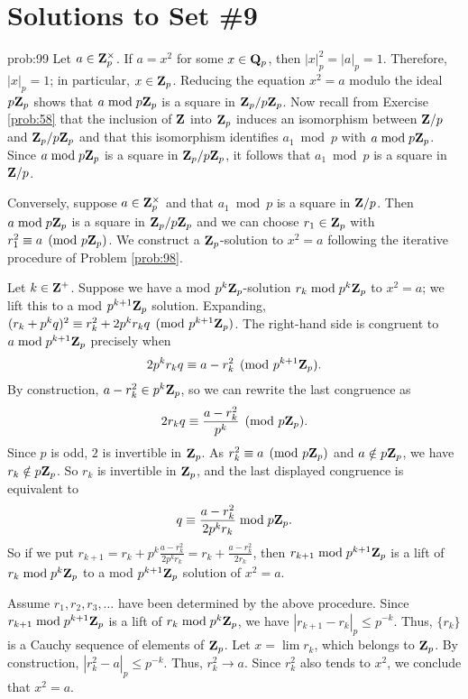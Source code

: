 \chapter*{Solutions to Set \#9}
\label{set8sols}

\begin{sol}{prob:99} Let $a \in \mathbf{Z}_p^{\times}$. If $a=x^2$ for some $x \in \mathbf{Q}_p$, then $|x|_p^2 = |a|_p = 1$. Therefore, $|x|_p = 1$; in particular, $x \in \mathbf{Z}_p$. Reducing the equation $x^2=a$ modulo the ideal $p\mathbf{Z}_p$ shows that $a\bmod{p\mathbf{Z}_p}$ is a square in $\mathbf{Z}_p/p\mathbf{Z}_p$. Now recall from Exercise \ref{prob:58} that the inclusion of $\mathbf{Z}$ into $\mathbf{Z}_p$ induces an isomorphism between $\mathbf{Z}/p$ and $\mathbf{Z}_p/p\mathbf{Z}_p$ and that this isomorphism identifies $a_1\bmod{p}$ with $a\bmod{p\mathbf{Z}_p}$. Since $a\bmod{p\mathbf{Z}_p}$ is a square in $\mathbf{Z}_p/p\mathbf{Z}_p$, it follows that $a_1\bmod{p}$ is a square in $\mathbf{Z}/p$.

Conversely, suppose $a\in \mathbf{Z}_p^{\times}$ and that $a_1\bmod{p}$ is a square in $\mathbf{Z}/p$. Then $a\bmod{p\mathbf{Z}_p}$ is a square in $\mathbf{Z}_p/p\mathbf{Z}_p$ and we can choose $r_1 \in \mathbf{Z}_p$ with $r_1^2\equiv a\pmod{p\mathbf{Z}_p}$. We construct a $\mathbf{Z}_p$-solution to $x^2=a$ following the iterative procedure of Problem \ref{prob:98}.

Let $k \in \mathbf{Z}^{+}$. Suppose we have a mod $p^k\mathbf{Z}_p$-solution $r_k\bmod{p^k\mathbf{Z}_p}$ to $x^2=a$; we lift this to a mod $p^{k+1}\mathbf{Z}_p$ solution. Expanding, $(r_k + p^k q)^2 \equiv r_k^2 + 2p^k r_k q \pmod{p^{k+1}\mathbf{Z}_p}$. The right-hand side is congruent to $a\bmod{p^{k+1}\mathbf{Z}_p}$ precisely when
\[ 2p^k r_k q \equiv a-r_k^2\pmod{p^{k+1}\mathbf{Z}_p}. \]
By construction, $a-r_k^2 \in p^k\mathbf{Z}_p$, so we can rewrite the last congruence as
\[ 2r_k q \equiv \frac{a-r_k^2}{p^k} \pmod{p\mathbf{Z}_p}.\]
Since $p$ is odd, $2$ is invertible in $\mathbf{Z}_p$. As $r_k^2\equiv a\pmod{p\mathbf{Z}_p}$ and $a\notin p\mathbf{Z}_p$, we have $r_k\notin p\mathbf{Z}_p$. So $r_k$ is invertible in $\mathbf{Z}_p$, and the last displayed congruence is equivalent to 
\[ q \equiv \frac{a-r_k^2}{2 p^k r_k} \bmod{p\mathbf{Z}_p}.\] 
So if we put $r_{k+1} = r_k + p^k\frac{a-r_k^2}{2 p^k r_k} = r_k + \frac{a-r_k^2}{2 r_k}$, then $r_{k+1}\bmod{p^{k+1}\mathbf{Z}_p}$ is a lift of $r_k\bmod{p^k\mathbf{Z}_p}$ to a mod $p^{k+1}\mathbf{Z}_p$ solution of $x^2=a$.

Assume $r_1, r_2, r_3,\dots$ have been determined by the above procedure.
Since $r_{k+1}\bmod{p^{k+1}\mathbf{Z}_p}$ is a lift of $r_k\bmod{p^k\mathbf{Z}_p}$, we have $|r_{k+1}-r_k|_{p} \le p^{-k}$. Thus, $\{r_k\}$ is a Cauchy sequence of elements of $\mathbf{Z}_p$.  Let $x = \lim r_k$, which belongs to $\mathbf{Z}_p$. By construction, $|r_k^2 - a|_p \le p^{-k}$. Thus, $r_k^2 \to a$. Since $r_k^2$ also tends to $x^2$, we conclude that $x^2=a$.
\end{sol}

